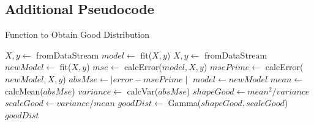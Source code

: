\documentclass{mpaper}
\begin{document}
\begin{appendix}
\section{Additional Pseudocode}\label{gooddist}
\begin{algorithm}[h]
\caption{Function to Obtain Good Distribution}
\begin{algorithmic}
    \State $X, y \gets$ fromDataStream
    \State $model \gets$ fit($X,y$)
        \State $X, y \gets$ fromDataStream
        \State $newModel \gets$ fit($X,y$)
        \State $mse \gets$ calcError($model,X,y$)
        \State $msePrime \gets$ calcError($newModel,X,y$)
        \State $absMse \gets \mid error - msePrime \mid$
        \State $model \gets newModel$
    \EndFor
    \State $mean \gets$ calcMean($absMse$)
    \State $variance \gets$ calcVar($absMse$)
    \State $shapeGood \gets mean^2/variance$
    \State $scaleGood \gets variance/mean$
    \State $goodDist \gets$ Gamma($shapeGood, scaleGood$)\\
    \Return $goodDist$
\EndFunction
\end{algorithmic}
\end{algorithm}

\end{appendix}
\end{document}
